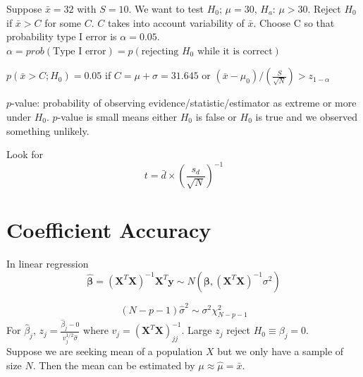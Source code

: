 \begin{exm}{}
Suppose $\bar x = 32$ with $S=10$. 
We want to test $H_0$; $\mu=30$, $H_a$: $\mu>30$.
Reject $H_0$ if $\bar x > C$ for some $C$. $C$ takes into account variability of $\bar x$.
Choose C so that probability type I error is $\alpha = 0.05$. 
$\alpha = prob(\text{Type I error}) = p(\text{rejecting } H_0 \text{ while it is correct})$

$p(\bar x > C; H_0) = 0.05$ if $C = \mu +\sigma = 31.645$ or $(\bar x - \mu_0) / \left ( \frac{S}{\sqrt{N}} \right) > z_{1-\alpha}$

$p$-value: probability of observing evidence/statistic/estimator as extreme or more under $H_0$.
$p$-value is small means either $H_0$ is false or $H_0$ is true 
and we observed something unlikely.
\end{exm}



Look for $$t = {\bar d} \times \left(\frac{s_d}{\sqrt{N}}\right)^{-1}$$

\section{Coefficient Accuracy}
\label{sec:Coefficient_Accuracy_Interview}
In linear regression
\begin{equation}
\bm \hat \beta  = (\mathbf{X}^T \mathbf{X})^{-1} \mathbf{X}^T \mathbf{y}\sim N(\bm \beta , (\mathbf{X}^T \mathbf{X})^{-1} \sigma^2)
\end{equation}

\begin{equation}
(N-p-1)\hat \sigma^2 \sim \sigma^2 \chi^2_{N-p-1}
\end{equation}
For $\hat \beta_j$, $z_j = \frac{\hat \beta_j - 0}{ v_j^{1/2} \hat \sigma}$ where
$v_j = (\mathbf{X}^T \mathbf{X})^{-1}_{jj}$. Large $z_j$ reject $H_0 \equiv \beta_j=0$.\\

Suppose we are seeking mean of a population $X$
but we only have a sample of size $N$. Then the mean
can be estimated by $\mu \approx \hat \mu = \bar x$.

